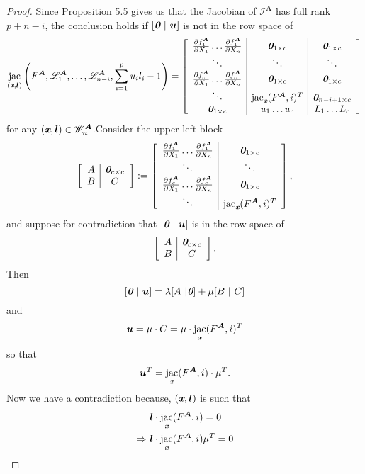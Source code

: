 \documentclass[a4paper]{article}
\def\sLA{\mathscr{L}^{\mA}}
\def\sI{\mathscr{I}}
\def\bz{\textit{\textbf{0}}}
\def\mA{{\bm A}}
\def\ub{{\bm u}}
\def\lb{{\bm l}}
\def\xb{\textit{\textbf{x}}}
\DeclareMathOperator{\jac}{jac}
\def\pa{\partial}
\def\WlA{\mathscr{W}_{\ub}^{\mA}}
\def\udl{\sum_{i=1}^pu_il_i}
\begin{document}
    \begin{proof}
    Since Proposition 5.5 gives us that the Jacobian of $\sI^{\mA}$ has full rank $p+n-i$, the conclusion holds if $[\bz~|~\ub]$ is not in the row space of  
    \[
    \jac_{(\xb,\lb)}\left(F^{\mA},\sLA_1,\hdots,\sLA_{n-i},\udl -1\right)
    =
    \left[ 
    \begin{array}{c|c|c}
    \frac{\pa f_1^{\mA}}{\pa X_1} \hdots \frac{\pa f_1^{\mA}}{\pa X_n} & \bz_{1\times c} & \bz_{1\times c}\\
    \ddots & \ddots & \ddots\\
    \frac{\pa f_c^{\mA}}{\pa X_1} \hdots \frac{\pa f_c^{\mA}}{\pa X_n} & \bz_{1\times c} & \bz_{1\times c}\\
    \ddots &\jac_{\xb}(F^{\mA},i)^T & \bz_{n-i+1\times c}\\
    \bz_{1 \times c} & u_1 \hdots u_c & L_1 \hdots L_c 
    \end{array}
    \right]
    \]
    for any $(\xb,\bm l) \in \WlA$.Consider the upper left block
    \[
    \left[ 
    \begin{array}{c|c}
    A & \bz_{c\times c} \\
    B & C 
    \end{array}
    \right]
    :=
    \left[ 
    \begin{array}{c|c}
    \frac{\pa f_1^{\mA}}{\pa X_1} \hdots \frac{\pa f_1^{\mA}}{\pa X_n} & \bz_{1\times c} \\
    \ddots & \ddots \\
    \frac{\pa f_c^{\mA}}{\pa X_1} \hdots \frac{\pa f_c^{\mA}}{\pa X_n} & \bz_{1\times c} \\
    \ddots &\jac_{\xb}(F^{\mA},i)^T
    \end{array}
    \right],
    \]
    and suppose for contradiction that $[\bz~|~\ub]$ is in the row-space of 
    \[
    \left[ 
    \begin{array}{c|c}
    A & \bz_{c\times c} \\
    B & C 
    \end{array}
    \right].
    \]
    Then 
    \[
    [\bz~|~\ub]
    =
    \lambda [A~|\bz] + \mu[B~|~C]
    \]
    and 
    \[
    \ub = \mu \cdot C = \mu \cdot \jac_{\xb} (F^{\mA},i)^T
    \]
    so that 
    \[
    \ub^T = \jac_{\xb} (F^{\mA},i) \cdot \mu^T.
    \]
    Now we have a contradiction because, $(\xb,\lb)$ is such that 
    \begin{align*}
        &\lb \cdot \jac_{\xb} (F^{\mA},i)=0\\
        \Rightarrow
        ~&\lb \cdot \jac_{\xb} (F^{\mA},i) \mu^T= 0\\

\end{align*}
\end{proof}
\end{document}

